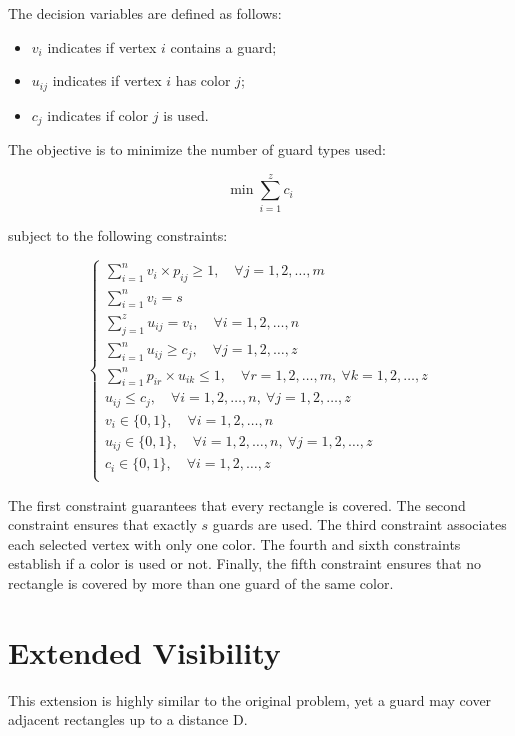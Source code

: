 \documentclass{report}
\begin{document}
The decision variables are defined as follows:

\begin{itemize}
    \item $v_i$ indicates if vertex $i$ contains a guard;
    \item $u_{ij}$ indicates if vertex $i$ has color $j$;
    \item $c_j$ indicates if color $j$ is used.
\end{itemize}

The objective is to minimize the number of guard types used:

$$
\min \sum_{i = 1}^{z} c_i
$$

subject to the following constraints:

$$
\begin{cases}
	\sum_{i = 1}^{n} v_i \times p_{ij} \ge 1, \quad \forall j = 1,2,\dots,m \\
	\sum_{i = 1}^{n} v_i = s \\
	\sum_{j = 1}^{z} u_{ij} = v_i, \quad \forall i = 1,2,\dots,n \\
	\sum_{i = 1}^{n} u_{ij} \ge c_j, \quad \forall j = 1,2,\dots, z \\
	\sum_{i = 1}^{n} p_{ir} \times u_{ik} \le 1, \quad \forall r = 1,2,\dots,m,\ \forall k = 1,2,\dots,z \\
	u_{ij} \le c_j, \quad \forall i = 1,2,\dots,n,\ \forall j = 1,2,\dots,z \\
	v_i \in \{0,1\}, \quad \forall i = 1,2,\dots,n \\
	u_{ij} \in \{0,1\}, \quad \forall i = 1,2,\dots,n,\ \forall j = 1,2,\dots,z \\
	c_i \in \{0,1\}, \quad \forall i = 1,2,\dots,z \\
\end{cases}
$$

The first constraint guarantees that every rectangle is covered. 
The second constraint ensures that exactly $s$ guards are used. 
The third constraint associates each selected vertex with only one color. 
The fourth and sixth constraints establish if a color is used or not. 
Finally, the fifth constraint ensures that no rectangle is covered by more than one guard of the same color.

\section{Extended Visibility}

This extension is highly similar to the original problem, yet a guard may cover adjacent rectangles up to a distance D.
\end{document}
